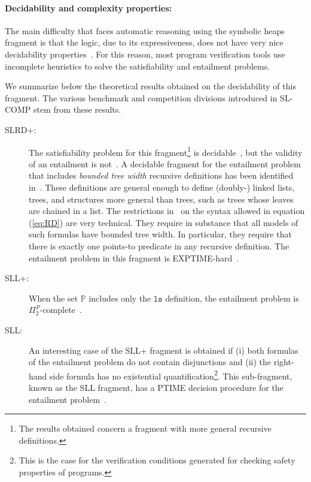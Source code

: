 \documentclass[twoside,11pt]{article}
\newcommand{\preds}{\mathbb{P}}
\newcommand{\ls}{\mathtt{ls}}
\begin{document}
\paragraph{Decidability and complexity properties:}
The main difficulty that faces automatic reasoning using the symbolic heaps fragment is that the logic, 
due to its expressiveness, does not have very nice decidability properties~\cite{AntonopoulosGHKO14}.
For this reason, most program verification tools use incomplete heuristics to solve the satisfiability and entailment problems.

We summarize below the theoretical results obtained on the decidability of this fragment.
The various benchmark and competition divisions introduced in SL-COMP stem from these results.
\begin{description}
\item[SLRD+:]
The satisfiability problem for this fragment\footnote{The results obtained concern a fragment with more general recursive definitions.} is decidable~\cite{BrotherstonFGNP13},
but the validity of an entailment is not~\cite{AntonopoulosGHKO14}.
%
A decidable fragment for the entailment problem that includes \emph{bounded tree width} recursive definitions has been identified in~\cite{IosifRS13}.
These definitions are general enough to define (doubly-) linked lists, trees,
and structures more general than trees, such as trees whose leaves are chained in
a list. 
The restrictions in~\cite{IosifRS13} on the syntax allowed in equation (\ref{eq:RD}) are very technical. They require in substance that all models of such formulas have bounded tree width. 
In particular, they require that there is exactly one points-to predicate in any recursive definition.
The entailment problem in this fragment is EXPTIME-hard~\cite{AntonopoulosGHKO14}.

\item[SLL+:]
When the set $\preds$ includes only the $\ls$ definition, 
the entailment problem is $\Pi^P_2$-complete~\cite{AntonopoulosGHKO14}.

\item[SLL:]
An interesting case of the SLL+ fragment is obtained if 
(i) both formulas of the entailment problem do not contain disjunctions and 
(ii) the right-hand side formula has no existential quantification\footnote{This is the case for the verification conditions generated for checking safety properties of programs.}. 
This sub-fragment, known as the SLL fragment, has a PTIME decision procedure for the entailment problem~\cite{CookHOPW11}.
\end{description}
\end{document}
